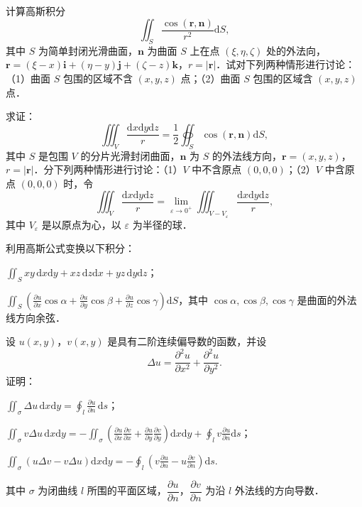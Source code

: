 \begin{xiti}
\item 计算高斯积分
\[
\iint_{S}\frac{\cos(\bm{r},\bm{n})}{r^{2}}\mathrm{d}S,
\]
其中 $S$ 为简单封闭光滑曲面，$\bm{n}$ 为曲面 $S$ 上在点 $(\xi,\eta,\zeta)$ 处的外法向，$\bm{r}=(\xi-x)\bm{i}+(\eta-y)\bm{j}+(\zeta-z)\bm{k}$，$r=|\bm{r}|$．试对下列两种情形进行讨论：（1）曲面 $S$ 包围的区域不含 $(x,y,z)$ 点；（2）曲面 $S$ 包围的区域含 $(x,y,z)$ 点．
\item 求证：
\[
\iiint_{V}\frac{\mathrm{d}x\mathrm{d}y\mathrm{d}z}{r}=\frac{1}{2}\oiint_{S}\cos(\bm{r},\bm{n})\mathrm{d}S,
\]
其中 $S$ 是包围 $V$ 的分片光滑封闭曲面，$\bm{n}$ 为 $S$ 的外法线方向，$\bm{r}=(x,y,z)$，$r=|\bm{r}|$．分下列两种情形进行讨论：（1）$V$ 中不含原点 $(0,0,0)$；（2）$V$ 中含原点 $(0,0,0)$ 时，令
\[
\iiint_{V}\frac{\mathrm{d}x\mathrm{d}y\mathrm{d}z}{r}=\lim_{\varepsilon\to 0^{+}}\iiint_{V-V_{\varepsilon}}\frac{\mathrm{d}x\mathrm{d}y\mathrm{d}z}{r},
\]
其中 $V_{\varepsilon}$ 是以原点为心，以 $\varepsilon$ 为半径的球．
\item 利用高斯公式变换以下积分：
\begin{ziti}
\item $\displaystyle\iint_{S}xy\,\mathrm{d}x\mathrm{d}y+xz\,\mathrm{d}z\mathrm{d}x+yz\,\mathrm{d}y\mathrm{d}z$；
\item $\displaystyle\iint_{S}\left(\frac{\partial u}{\partial x}\cos\alpha+\frac{\partial u}{\partial y}\cos\beta+\frac{\partial u}{\partial z}\cos\gamma\right)\mathrm{d}S$，其中 $\cos\alpha,\cos\beta,\cos\gamma$ 是曲面的外法线方向余弦．
\end{ziti}
\item 设 $u(x,y)$，$v(x,y)$ 是具有二阶连续偏导数的函数，并设
\[
\Delta u=\frac{\partial^{2}u}{\partial x^{2}}+\frac{\partial^{2}u}{\partial y^{2}}.
\]
证明：
\begin{ziti}
\item $\displaystyle\iint_{\sigma}\Delta u\,\mathrm{d}x\mathrm{d}y=\oint_{l}\frac{\partial u}{\partial n}\,\mathrm{d}s$；
\item $\displaystyle\iint_{\sigma}v\Delta u\,\mathrm{d}x\mathrm{d}y=-\iint_{\sigma}\left(\frac{\partial u}{\partial x}\frac{\partial v}{\partial x}+\frac{\partial u}{\partial y}\frac{\partial v}{\partial y}\right)\mathrm{d}x\mathrm{d}y+\oint_{l}v\frac{\partial u}{\partial n}\mathrm{d}s$；
\item $\displaystyle\iint_{\sigma}\left(u\Delta v-v\Delta u\right)\mathrm{d}x\mathrm{d}y=-\oint_{l}\left(v\frac{\partial u}{\partial n}-u\frac{\partial v}{\partial n}\right)\mathrm{d}s$.
\end{ziti}
其中 $\sigma$ 为闭曲线 $l$ 所围的平面区域，$\dfrac{\partial u}{\partial n}$，$\dfrac{\partial v}{\partial n}$ 为沿 $l$ 外法线的方向导数．

\end{xiti}
